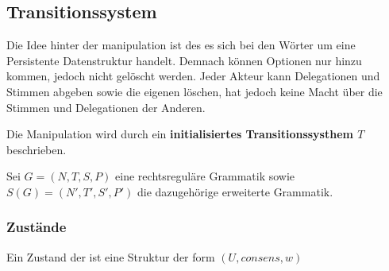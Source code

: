 \documentclass[]{article}
\begin{document}






\subsection{Transitionssystem}


Die Idee hinter der manipulation ist des es sich bei den Wörter um eine Persistente Datenstruktur handelt. Demnach können Optionen nur hinzu kommen, jedoch nicht gelöscht werden. Jeder Akteur kann Delegationen und Stimmen abgeben sowie
die eigenen löschen, hat jedoch keine Macht über die Stimmen und
Delegationen der Anderen.

Die Manipulation wird durch ein \textbf{initialisiertes Transitionssysthem $T$}
beschrieben.

Sei $G = (N,T,S,P)$ eine rechtsreguläre Grammatik sowie
$S(G)=(N',T',S',P')$ die dazugehörige erweiterte Grammatik.

% 

\subsubsection*{Zustände}

Ein Zustand der ist eine Struktur der form $(U, consens, w)$
\end{document}
